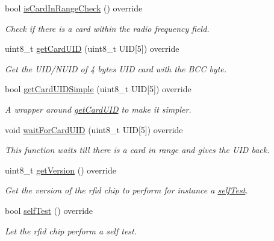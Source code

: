 \begin{DoxyCompactItemize}
bool \mbox{\hyperlink{class_m_f_r_c522_a29ce0dd04495f9352e32ada5ecc5fd03}{is\+Card\+In\+Range\+Check}} () override
\begin{DoxyCompactList}\small\item\em Check if there is a card within the radio frequency field. \end{DoxyCompactList}\item 
uint8\+\_\+t \mbox{\hyperlink{class_m_f_r_c522_ad3c7ab4c70988e80c400f36f724a12b7}{get\+Card\+U\+ID}} (uint8\+\_\+t U\+ID\mbox{[}5\mbox{]}) override
\begin{DoxyCompactList}\small\item\em Get the U\+I\+D/\+N\+U\+ID of 4 bytes U\+ID card with the B\+CC byte. \end{DoxyCompactList}\item 
bool \mbox{\hyperlink{class_m_f_r_c522_a33c20be6030f635d986984db4999a1eb}{get\+Card\+U\+I\+D\+Simple}} (uint8\+\_\+t U\+ID\mbox{[}5\mbox{]}) override
\begin{DoxyCompactList}\small\item\em A wrapper around \mbox{\hyperlink{class_m_f_r_c522_ad3c7ab4c70988e80c400f36f724a12b7}{get\+Card\+U\+ID}} to make it simpler. \end{DoxyCompactList}\item 
void \mbox{\hyperlink{class_m_f_r_c522_aeb05c83c2d139eb2c57f400399982691}{wait\+For\+Card\+U\+ID}} (uint8\+\_\+t U\+ID\mbox{[}5\mbox{]}) override
\begin{DoxyCompactList}\small\item\em This function waits till there is a card in range and gives the U\+ID back. \end{DoxyCompactList}\item 
uint8\+\_\+t \mbox{\hyperlink{class_m_f_r_c522_a25fb0a50bf7db51ab9c5bc2ff4fa84e3}{get\+Version}} () override
\begin{DoxyCompactList}\small\item\em Get the version of the rfid chip to perform for instance a \mbox{\hyperlink{class_m_f_r_c522_adcc4f5eb212c1a94e462eab459bd685e}{self\+Test}}. \end{DoxyCompactList}\item 
bool \mbox{\hyperlink{class_m_f_r_c522_adcc4f5eb212c1a94e462eab459bd685e}{self\+Test}} () override
\begin{DoxyCompactList}\small\item\em Let the rfid chip perform a self test. \end{DoxyCompactList}\end{DoxyCompactItemize}
